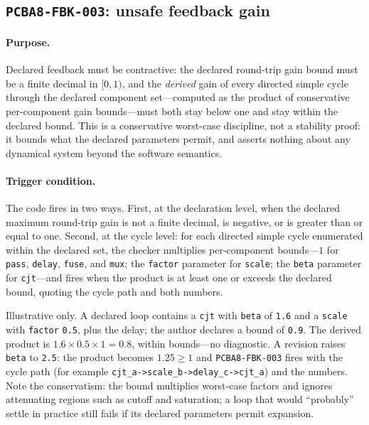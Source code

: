 \subsection{\texttt{PCBA8-FBK-003}: unsafe feedback gain}\label{ch07:sub:fbk003}

\paragraph{Purpose.} Declared feedback must be contractive: the declared round-trip gain bound must be a finite decimal in $[0,1)$, and the \emph{derived} gain of every directed simple cycle through the declared component set---computed as the product of conservative per-component gain bounds---must both stay below one and stay within the declared bound. This is a conservative worst-case discipline, not a stability proof: it bounds what the declared parameters permit, and asserts nothing about any dynamical system beyond the software semantics.

\paragraph{Trigger condition.} The code fires in two ways. First, at the declaration level, when the declared maximum round-trip gain is not a finite decimal, is negative, or is greater than or equal to one. Second, at the cycle level: for each directed simple cycle enumerated within the declared set, the checker multiplies per-component bounds---$1$ for \texttt{pass}, \texttt{delay}, \texttt{fuse}, and \texttt{mux}; the \texttt{factor} parameter for \texttt{scale}; the \texttt{beta} parameter for \texttt{cjt}---and fires when the product is at least one or exceeds the declared bound, quoting the cycle path and both numbers.

\begin{example}\label{ch07:ex:fbk003}
Illustrative only. A declared loop contains a \texttt{cjt} with \texttt{beta} of \texttt{1.6} and a \texttt{scale} with \texttt{factor} \texttt{0.5}, plus the delay; the author declares a bound of \texttt{0.9}. The derived product is $1.6 \times 0.5 \times 1 = 0.8$, within bounds---no diagnostic. A revision raises \texttt{beta} to \texttt{2.5}: the product becomes $1.25 \geq 1$ and \texttt{PCBA8-FBK-003} fires with the cycle path (for example \texttt{cjt\_a->scale\_b->delay\_c->cjt\_a}) and the numbers. Note the conservatism: the bound multiplies worst-case factors and ignores attenuating regions such as cutoff and saturation; a loop that would ``probably'' settle in practice still fails if its declared parameters permit expansion.
\end{example}

